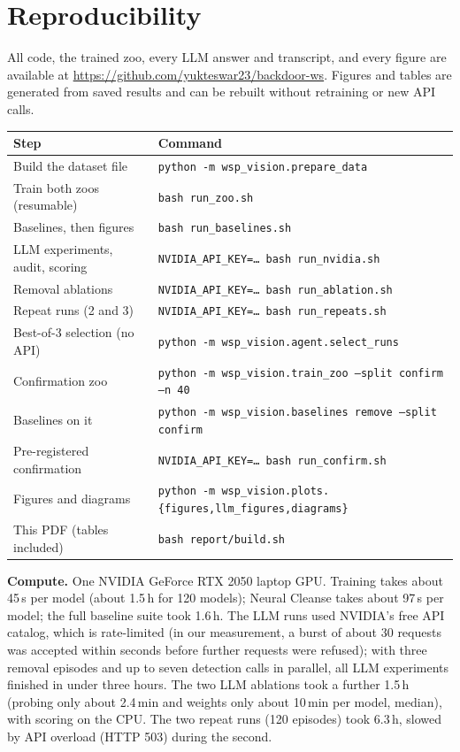 \documentclass[11pt]{article}
\begin{document}
\section{Reproducibility}
All code, the trained zoo, every LLM answer and transcript, and every figure are available at
\url{https://github.com/yukteswar23/backdoor-ws}. Figures and tables are generated from saved results
and can be rebuilt without retraining or new API calls.
\begin{center}
\small
\begin{tabular}{ll}
  \toprule
  Step & Command \\
  \midrule
  Build the dataset file & \texttt{python -m wsp\_vision.prepare\_data} \\
  Train both zoos (resumable) & \texttt{bash run\_zoo.sh} \\
  Baselines, then figures & \texttt{bash run\_baselines.sh} \\
  LLM experiments, audit, scoring & \texttt{NVIDIA\_API\_KEY=\dots\ bash run\_nvidia.sh} \\
  Removal ablations & \texttt{NVIDIA\_API\_KEY=\dots\ bash run\_ablation.sh} \\
  Repeat runs (2 and 3) & \texttt{NVIDIA\_API\_KEY=\dots\ bash run\_repeats.sh} \\
  Best-of-3 selection (no API) & \texttt{python -m wsp\_vision.agent.select\_runs} \\
  Confirmation zoo & \texttt{python -m wsp\_vision.train\_zoo --split confirm --n 40} \\
  Baselines on it & \texttt{python -m wsp\_vision.baselines remove --split confirm} \\
  Pre-registered confirmation & \texttt{NVIDIA\_API\_KEY=\dots\ bash run\_confirm.sh} \\
  Figures and diagrams & \texttt{python -m wsp\_vision.plots.\{figures,llm\_figures,diagrams\}} \\
  This PDF (tables included) & \texttt{bash report/build.sh} \\
  \bottomrule
\end{tabular}
\end{center}
\noindent\textbf{Compute.} One NVIDIA GeForce RTX 2050 laptop GPU. Training takes about 45\,s per model
(about 1.5\,h for 120 models); Neural Cleanse takes about 97\,s per model; the full baseline suite took
1.6\,h. The LLM runs used NVIDIA's free API catalog, which is rate-limited (in our measurement, a burst
of about 30 requests was accepted within seconds before further requests were refused); with three removal episodes and up to seven detection calls in parallel, all LLM
experiments finished in under three hours. The two LLM ablations took a further 1.5\,h (probing only
about 2.4\,min and weights only about 10\,min per model, median), with scoring on the CPU. The two
repeat runs (120 episodes) took 6.3\,h, slowed by API overload (HTTP 503) during the second.
\end{document}
